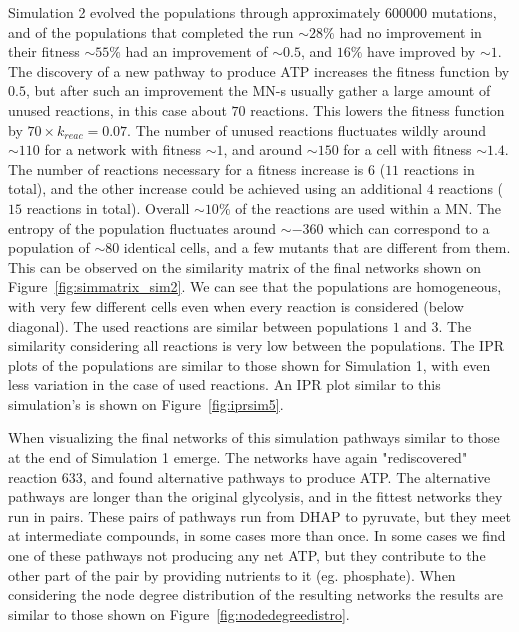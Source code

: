 \documentclass[a4paper,12pt]{article}
\begin{document}
Simulation 2 evolved the populations through approximately $600 000$ mutations, and of the populations that completed the run $\sim 28 \%$ had no improvement in their fitness $\sim 55 \%$ had an improvement of $\sim 0.5$, and $16 \%$ have improved by $\sim 1$. The discovery of a new pathway to produce ATP increases the fitness function by $0.5$, but after such an improvement the MN-s usually gather a large amount of unused reactions, in this case about $70$ reactions. This lowers the fitness function by $70\times k_{reac}=0.07$. The number of unused reactions fluctuates wildly around $\sim 110$ for a network with fitness $\sim 1$, and around $\sim 150$ for a cell with fitness $\sim 1.4$. The number of reactions necessary for a fitness increase is $6$ ($11$ reactions in total), and the other increase could be achieved using an additional $4$ reactions ($15$ reactions in total). Overall $\sim 10\%$ of the reactions are used within a MN. The entropy of the population fluctuates around $\sim -360$ which can correspond to a population of $\sim 80$ identical cells, and a few mutants that are different from them. This can be observed on the similarity matrix of the final networks shown on Figure~\ref{fig:simmatrix_sim2}. We can see that the populations are homogeneous, with very few different cells even when every reaction is considered (below diagonal). The used reactions are similar between populations $1$ and $3$. The similarity considering all reactions is very low between the populations. 
The IPR plots of the populations are similar to those shown for Simulation 1, with even less variation in the case of used reactions. An IPR plot similar to this simulation's is shown on Figure~\ref{fig:iprsim5}. 

When visualizing the final networks of this simulation pathways similar to those at the end of Simulation 1 emerge. The networks have again "rediscovered" reaction $633$, and found alternative pathways to produce ATP. The alternative pathways are longer than the original glycolysis, and in the fittest networks they run in pairs. These pairs of pathways run from DHAP to pyruvate, but they meet at intermediate compounds, in some cases more than once. In some cases we find one of these pathways not producing any net ATP, but they contribute to the other part of the pair by providing nutrients to it (eg. phosphate). When considering the node degree distribution of the resulting networks the results are similar to those shown on Figure~\ref{fig:nodedegreedistro}. 
\end{document}
